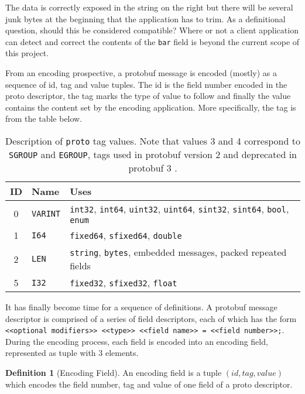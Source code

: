 \documentclass[11pt]{article}
\theoremstyle{definition}
\newtheorem{definition}{Definition}[section]
\theoremstyle{plain}
\begin{document}
The data is correctly exposed in the string on the right but there will be
several junk bytes at the beginning that the application has to trim. As a
definitional question, should this be considered compatible? Where or not a
client application can detect and correct the contents of the \texttt{bar} field
is beyond the current scope of this project.

From an encoding prospective, a protobuf message is encoded (mostly) as a
sequence of id, tag and value tuples. The id is the field number encoded in the
proto descriptor, the tag marks the type of value to follow and finally the
value contains the content set by the encoding application. More specifically,
the tag is from the table below.

\begin{table}[H]
	\centering
	\begin{tabular}{cll}
		\toprule
		ID & Name            & Uses                                                 \\
		\midrule
		0  & \texttt{VARINT} & \texttt{int32}, \texttt{int64}, \texttt{uint32},
		\texttt{uint64}, \texttt{sint32}, \texttt{sint64},
		\texttt{bool}, \texttt{enum}                                                \\
		1  & \texttt{I64}    & \texttt{fixed64}, \texttt{sfixed64}, \texttt{double} \\
		2  & \texttt{LEN}    & \texttt{string}, \texttt{bytes}, embedded messages,
		packed repeated fields                                                      \\
		5  & \texttt{I32}    & \texttt{fixed32}, \texttt{sfixed32},
		\texttt{float}                                                              \\
		\bottomrule
	\end{tabular}

	\vspace{4mm}
	\caption[]{Description of \texttt{proto} tag values. Note that values 3 and
		4 correspond to \texttt{SGROUP} and \texttt{EGROUP}, tags used in protobuf
		version 2 and deprecated in protobuf 3 \autocite{Encoding}.}\label{tab:tags}
\end{table}

It has finally become time for a sequence of definitions. A protobuf message
descriptor is comprised of a series of field descriptors, each of which has the
form \texttt{<<optional modifiers>> <<type>> <<field name>> = <<field
	number>>;}. During the encoding process, each field is encoded into an
encoding field, represented as tuple with 3 elements.
\\
\begin{definition}[Encoding Field]
	An encoding field is a tuple $(id, tag, value)$ which encodes the field
	number, tag and value of one field of a proto descriptor.
\end{definition}
\end{document}
